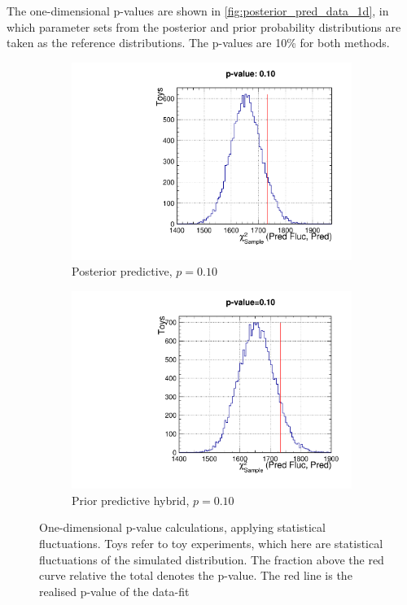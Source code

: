 The one-dimensional p-values are shown in \autoref{fig:posterior_pred_data_1d}, in which parameter sets from the posterior and prior probability distributions are taken as the reference distributions. The p-values are 10\% for both methods.
\begin{figure}[h]
	\begin{subfigure}[t]{0.49\textwidth}
		\includegraphics[width=\textwidth, trim={0mm 0mm 0mm 14mm}, clip,page=1]{figures/mach3/data/postpred/postpred_pvalue_1d}
		\caption{Posterior predictive, $p=0.10$}
	\end{subfigure}
	\begin{subfigure}[t]{0.49\textwidth}
		\includegraphics[width=\textwidth, trim={0mm 0mm 0mm 14mm}, clip,page=1]{figures/mach3/data/postpred/PriorPredictive_Hybrid}
		\caption{Prior predictive hybrid, $p=0.10$}
	\end{subfigure}
	\caption{One-dimensional p-value calculations, applying statistical fluctuations. Toys refer to toy experiments, which here are statistical fluctuations of the simulated distribution. The fraction above the red curve relative the total denotes the p-value. The red line is the realised p-value of the data-fit}
	\label{fig:posterior_pred_data_1d}
\end{figure}

